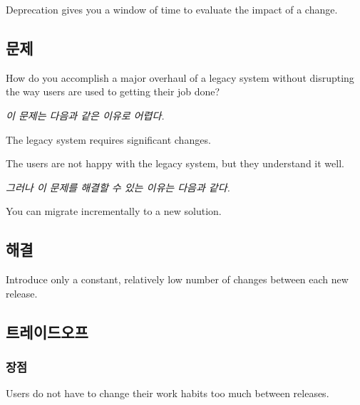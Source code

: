 \documentclass[a4paper,10pt,twoside]{book}
\begin{document}
Deprecation gives you a window of time to evaluate the impact of a change.




\subsection*{문제}

How do you accomplish a major overhaul of a legacy system without disrupting the way users are used to getting their job done?

\emph{이 문제는 다음과 같은 이유로 어렵다.}

\begin{bulletlist}
\item The legacy system requires significant changes.

\item The users are not happy with the legacy system, but they understand it well.
\end{bulletlist}

\emph{그러나 이 문제를 해결할 수 있는 이유는 다음과 같다.}

\begin{bulletlist}
\item You can migrate incrementally to a new solution.
\end{bulletlist}

\subsection*{해결}

Introduce only a constant, relatively low number of changes between each new release.

\subsection*{트레이드오프}

\subsubsection*{장점}

\begin{bulletlist}
\item Users do not have to change their work habits too much between releases.
\end{bulletlist}
\end{document}
